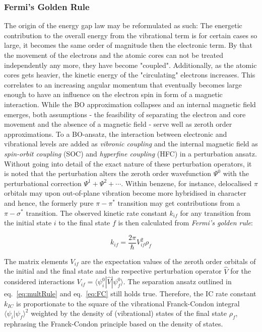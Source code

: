 			\subsubsection{Fermi's Golden Rule}
			The origin of the energy gap law may be reformulated as such: The energetic contribution to the overall energy from the vibrational term is for certain cases so large, it becomes the same order of magnitude then the electronic term. By that the movement of the electrons and the atomic cores can not be treated independently any more, they have become "coupled". Additionally, as the atomic cores gets heavier, the kinetic energy of the "circulating" electrons increases. This correlates to an increasing angular momentum that eventually becomes large enough to have an influence on the electron spin in form of a magnetic interaction. While the BO approximation collapses and an internal magnetic field emerges, both assumptions - the feasibility of separating the electron and core movement and the absence of a magnetic field - serve well as zeroth order approximations. To a BO-ansatz, the interaction between electronic and vibrational levels are added as \emph{vibronic coupling} and the internal magnetic field as \emph{spin-orbit coupling} (SOC) and \emph{hyperfine coupling} (HFC) in a perturbation ansatz. Without going into detail of the exact nature of these perturbation operators, it is noted that the perturbation alters the zeroth order wavefunction $\Psi^0$ with the perturbational correction $\Psi^1 + \Psi^2 + \cdots$. Within benzene, for instance, delocalised $\pi$ orbitals may upon  out-of-plane vibration become more  hybridised in character and hence, the formerly pure $\pi-\pi^{\ast}$ transition may get contributions from a $\pi-\sigma^{\ast}$ transition. The observed kinetic rate constant $k_{if}$ for any transition from the initial state $i$ to the final state $f$ is then calculated from \emph{Fermi's golden rule}:

			\begin{equation}
				\label{eq:Fermi}
				k_{if} = \frac{2\pi}{\hbar} V_{if}^2 \rho_f 
			\end{equation} 

			The matrix elements $V_{if}$ are the expectation values of the zeroth order orbitals of the initial and the final state and the respective perturbation operator $\hat{V}$ for the considered interactions $V_{if} = \langle \psi_i^0|\hat{V}|\psi_f^0 \rangle$. The separation ansatz outlined in eq.~\ref{eq:multRule} and eq.~\ref{eq:FC} still holds true. Therefore, the IC rate constant $k_{IC}$ is proportionate to the square of the vibrational Franck-Condon integral $\langle \psi_i|\psi_f \rangle^2$ weighted by the density of (vibrational) states of the final state $\rho_f$, rephrasing the Franck-Condon principle based on the density of states. 

